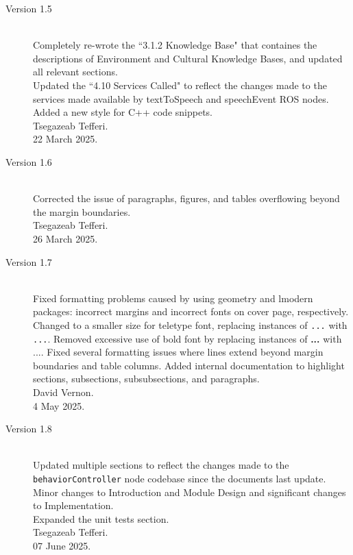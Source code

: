 \documentclass{CSSRforAfrica}
\begin{document}
\begin{description}
\newpage
\item [Version 1.5]~\\
Completely re-wrote the ``3.1.2 Knowledge Base" that containes the descriptions of Environment and Cultural Knowledge Bases, and updated all relevant sections. \\
Updated the ``4.10 Services Called" to reflect the changes made to the services made available by textToSpeech and speechEvent ROS nodes.\\
Added a new style for C++ code snippets.\\
Tsegazeab Tefferi. \\                            
22 March 2025.

\item [Version 1.6]~\\
Corrected the issue of paragraphs, figures, and tables overflowing beyond the margin boundaries. \\
Tsegazeab Tefferi. \\                            
26 March 2025.

\item [Version 1.7]~\\
Fixed formatting problems caused by using geometry and lmodern packages: incorrect margins and incorrect fonts on cover page, respectively.  Changed to a smaller size for teletype font, replacing instances of \texttt{...} with \texttt{\small ...}.  Removed excessive use of bold font by replacing instances of \textbf{...} with \textnormal{...}. Fixed several formatting issues where lines extend beyond margin boundaries and table columns.  Added internal documentation to highlight sections, subsections, subsubsections, and paragraphs.\\
David Vernon. \\                            
4 May 2025.


\item [Version 1.8]~\\
Updated multiple sections to reflect the changes made to the \texttt{\small behaviorController} node codebase since the documents last update. Minor changes to Introduction and Module Design and significant changes to Implementation.\\
Expanded the unit tests section.\\
Tsegazeab Tefferi. \\                            
07 June 2025.

\end{description}
\end{document}
